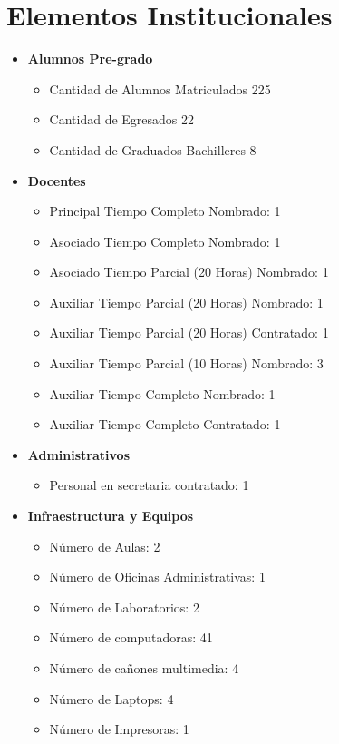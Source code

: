 \section{Elementos Institucionales}

\begin{itemize}
 
\item {\bf Alumnos Pre-grado}
\begin{itemize}
\item Cantidad de Alumnos Matriculados 225
\item Cantidad de Egresados 22
\item Cantidad de Graduados Bachilleres 8
\end{itemize} 

\item {\bf Docentes}
\begin{itemize}
\item Principal Tiempo Completo Nombrado: 1
\item Asociado Tiempo Completo Nombrado: 1
\item Asociado Tiempo Parcial (20 Horas) Nombrado: 1
\item Auxiliar Tiempo Parcial (20 Horas) Nombrado: 1
\item Auxiliar Tiempo Parcial (20 Horas) Contratado: 1
\item Auxiliar Tiempo Parcial (10 Horas) Nombrado: 3
\item Auxiliar Tiempo Completo Nombrado: 1
\item Auxiliar Tiempo Completo Contratado: 1
\end{itemize} 

\item {\bf Administrativos}
\begin{itemize}
\item Personal en secretaria contratado: 1
\end{itemize}

\item {\bf Infraestructura y Equipos}
\begin{itemize}
\item Número de Aulas: 2
\item Número de Oficinas Administrativas: 1
\item Número de Laboratorios: 2
\item Número de computadoras: 41
\item Número de cañones multimedia: 4 
\item Número de Laptops: 4
\item Número de Impresoras: 1
\end{itemize}

\end{itemize}

